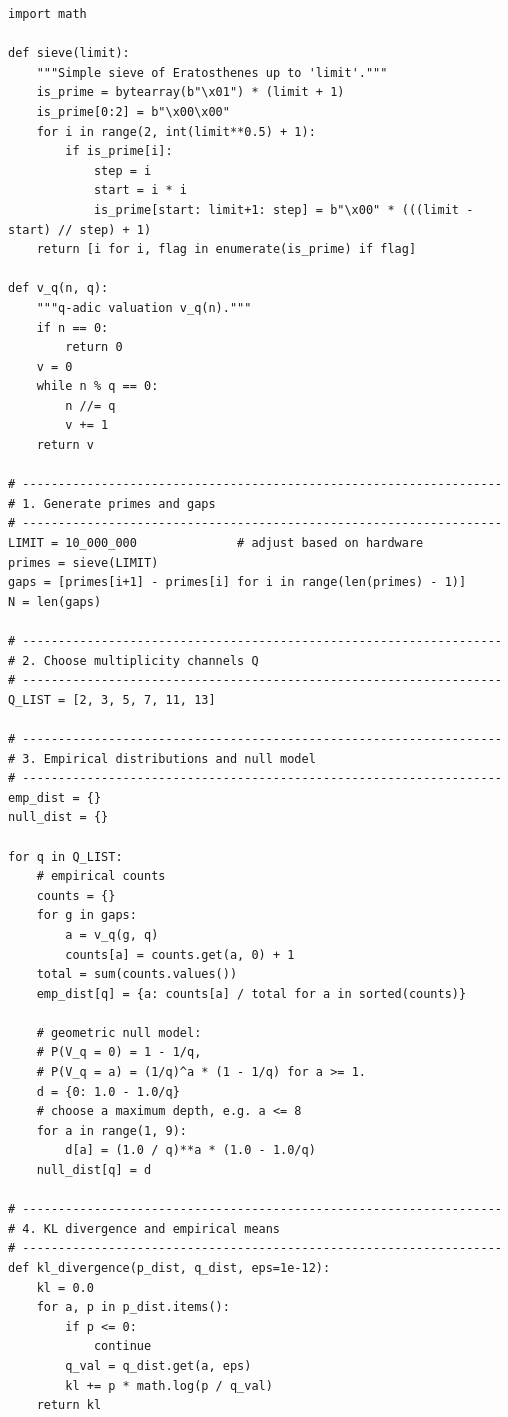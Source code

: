 \documentclass[11pt]{article}
\theoremstyle{definition}
\theoremstyle{plain}
\theoremstyle{remark}
\newcommand{\1}{\mathbb{1}}
\begin{document}
\begin{verbatim}
import math

def sieve(limit):
    """Simple sieve of Eratosthenes up to 'limit'."""
    is_prime = bytearray(b"\x01") * (limit + 1)
    is_prime[0:2] = b"\x00\x00"
    for i in range(2, int(limit**0.5) + 1):
        if is_prime[i]:
            step = i
            start = i * i
            is_prime[start: limit+1: step] = b"\x00" * (((limit - start) // step) + 1)
    return [i for i, flag in enumerate(is_prime) if flag]

def v_q(n, q):
    """q-adic valuation v_q(n)."""
    if n == 0:
        return 0
    v = 0
    while n % q == 0:
        n //= q
        v += 1
    return v

# -------------------------------------------------------------------
# 1. Generate primes and gaps
# -------------------------------------------------------------------
LIMIT = 10_000_000              # adjust based on hardware
primes = sieve(LIMIT)
gaps = [primes[i+1] - primes[i] for i in range(len(primes) - 1)]
N = len(gaps)

# -------------------------------------------------------------------
# 2. Choose multiplicity channels Q
# -------------------------------------------------------------------
Q_LIST = [2, 3, 5, 7, 11, 13]

# -------------------------------------------------------------------
# 3. Empirical distributions and null model
# -------------------------------------------------------------------
emp_dist = {}
null_dist = {}

for q in Q_LIST:
    # empirical counts
    counts = {}
    for g in gaps:
        a = v_q(g, q)
        counts[a] = counts.get(a, 0) + 1
    total = sum(counts.values())
    emp_dist[q] = {a: counts[a] / total for a in sorted(counts)}

    # geometric null model:
    # P(V_q = 0) = 1 - 1/q,
    # P(V_q = a) = (1/q)^a * (1 - 1/q) for a >= 1.
    d = {0: 1.0 - 1.0/q}
    # choose a maximum depth, e.g. a <= 8
    for a in range(1, 9):
        d[a] = (1.0 / q)**a * (1.0 - 1.0/q)
    null_dist[q] = d

# -------------------------------------------------------------------
# 4. KL divergence and empirical means
# -------------------------------------------------------------------
def kl_divergence(p_dist, q_dist, eps=1e-12):
    kl = 0.0
    for a, p in p_dist.items():
        if p <= 0:
            continue
        q_val = q_dist.get(a, eps)
        kl += p * math.log(p / q_val)
    return kl


\end{verbatim}
\end{document}
